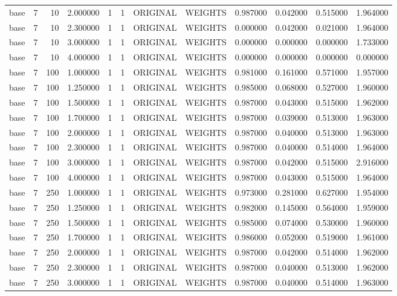 \begin{tabular}{lrrrllllrrrr}
base & 7 & 10 & 2.000000 & 1 & 1 & ORIGINAL & WEIGHTS & 0.987000 & 0.042000 & 0.515000 & 1.964000 \\
base & 7 & 10 & 2.300000 & 1 & 1 & ORIGINAL & WEIGHTS & 0.000000 & 0.042000 & 0.021000 & 1.964000 \\
base & 7 & 10 & 3.000000 & 1 & 1 & ORIGINAL & WEIGHTS & 0.000000 & 0.000000 & 0.000000 & 1.733000 \\
base & 7 & 10 & 4.000000 & 1 & 1 & ORIGINAL & WEIGHTS & 0.000000 & 0.000000 & 0.000000 & 0.000000 \\
base & 7 & 100 & 1.000000 & 1 & 1 & ORIGINAL & WEIGHTS & 0.981000 & 0.161000 & 0.571000 & 1.957000 \\
base & 7 & 100 & 1.250000 & 1 & 1 & ORIGINAL & WEIGHTS & 0.985000 & 0.068000 & 0.527000 & 1.960000 \\
base & 7 & 100 & 1.500000 & 1 & 1 & ORIGINAL & WEIGHTS & 0.987000 & 0.043000 & 0.515000 & 1.962000 \\
base & 7 & 100 & 1.700000 & 1 & 1 & ORIGINAL & WEIGHTS & 0.987000 & 0.039000 & 0.513000 & 1.963000 \\
base & 7 & 100 & 2.000000 & 1 & 1 & ORIGINAL & WEIGHTS & 0.987000 & 0.040000 & 0.513000 & 1.963000 \\
base & 7 & 100 & 2.300000 & 1 & 1 & ORIGINAL & WEIGHTS & 0.987000 & 0.040000 & 0.514000 & 1.964000 \\
base & 7 & 100 & 3.000000 & 1 & 1 & ORIGINAL & WEIGHTS & 0.987000 & 0.042000 & 0.515000 & 2.916000 \\
base & 7 & 100 & 4.000000 & 1 & 1 & ORIGINAL & WEIGHTS & 0.987000 & 0.043000 & 0.515000 & 1.964000 \\
base & 7 & 250 & 1.000000 & 1 & 1 & ORIGINAL & WEIGHTS & 0.973000 & 0.281000 & 0.627000 & 1.954000 \\
base & 7 & 250 & 1.250000 & 1 & 1 & ORIGINAL & WEIGHTS & 0.982000 & 0.145000 & 0.564000 & 1.959000 \\
base & 7 & 250 & 1.500000 & 1 & 1 & ORIGINAL & WEIGHTS & 0.985000 & 0.074000 & 0.530000 & 1.960000 \\
base & 7 & 250 & 1.700000 & 1 & 1 & ORIGINAL & WEIGHTS & 0.986000 & 0.052000 & 0.519000 & 1.961000 \\
base & 7 & 250 & 2.000000 & 1 & 1 & ORIGINAL & WEIGHTS & 0.987000 & 0.042000 & 0.514000 & 1.962000 \\
base & 7 & 250 & 2.300000 & 1 & 1 & ORIGINAL & WEIGHTS & 0.987000 & 0.040000 & 0.513000 & 1.962000 \\
base & 7 & 250 & 3.000000 & 1 & 1 & ORIGINAL & WEIGHTS & 0.987000 & 0.040000 & 0.514000 & 1.963000 \\

\end{tabular}
